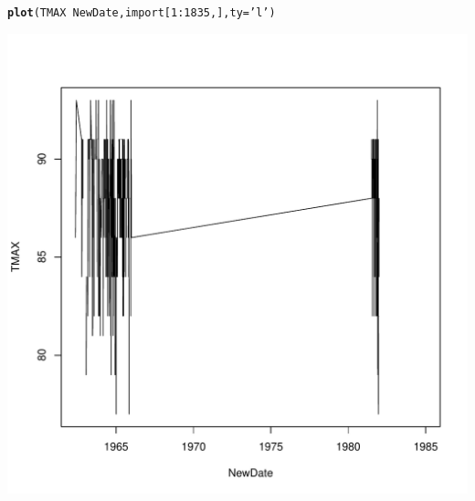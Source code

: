 \documentclass{article}\usepackage[]{graphicx}\usepackage[]{color}
\makeatletter
\def\maxwidth{ %
  \ifdim\Gin@nat@width>\linewidth
    \linewidth
  \else
    \Gin@nat@width
  \fi
}
\newcommand{\hlnum}[1]{\textcolor[rgb]{0.686,0.059,0.569}{#1}}%
\newcommand{\hlstr}[1]{\textcolor[rgb]{0.192,0.494,0.8}{#1}}%
\newcommand{\hlopt}[1]{\textcolor[rgb]{0,0,0}{#1}}%
\newcommand{\hlstd}[1]{\textcolor[rgb]{0.345,0.345,0.345}{#1}}%
\newcommand{\hlkwc}[1]{\textcolor[rgb]{0.333,0.667,0.333}{#1}}%
\newcommand{\hlkwd}[1]{\textcolor[rgb]{0.737,0.353,0.396}{\textbf{#1}}}%
\newenvironment{kframe}{%
 \def\at@end@of@kframe{}%
 \ifinner\ifhmode%
  \def\at@end@of@kframe{\end{minipage}}%
  \begin{minipage}{\columnwidth}%
 \fi\fi%
 \def\FrameCommand##1{\hskip\@totalleftmargin \hskip-\fboxsep
 \colorbox{shadecolor}{##1}\hskip-\fboxsep
     \hskip-\linewidth \hskip-\@totalleftmargin \hskip\columnwidth}%
 \MakeFramed {\advance\hsize-\width
   \@totalleftmargin\z@ \linewidth\hsize
   \@setminipage}}%
 {\par\unskip\endMakeFramed%
 \at@end@of@kframe}
\newenvironment{knitrout}{}{} %
\makeatother
\begin{document}
\begin{knitrout}
\color{fgcolor}\begin{kframe}
\begin{alltt}
\hlkwd{plot}\hlstd{(TMAX}\hlopt{~}\hlstd{NewDate, import[}\hlnum{1}\hlopt{:}\hlnum{1835}\hlstd{,],} \hlkwc{ty}\hlstd{=}\hlstr{'l'}\hlstd{)}
\end{alltt}
\end{kframe}
\includegraphics[width=\maxwidth]{figure/unnamed-chunk-11-1} 

\end{knitrout}





\end{document}
